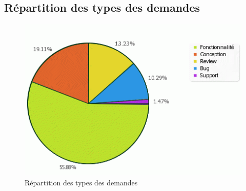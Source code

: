 \subsection{Répartition des types des demandes}
\begin{figure}[H!]
  \centering
    \includegraphics[width=15cm]{figures/pie}
  \caption{\label{fig:pie}Répartition des types des demandes}
\end{figure}
